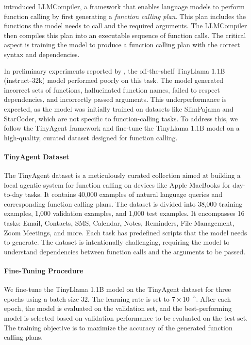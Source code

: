 \citet{llmcompiler} introduced LLMCompiler, a framework that enables language models to perform function calling by first generating a \emph{function calling plan}. This plan includes the functions the model needs to call and the required arguments. The LLMCompiler then compiles this plan into an executable sequence of function calls. The critical aspect is training the model to produce a function calling plan with the correct syntax and dependencies.

In preliminary experiments reported by \citet{tinyagent}, the off-the-shelf TinyLlama 1.1B (instruct-32k) model performed poorly on this task. The model generated incorrect sets of functions, hallucinated function names, failed to respect dependencies, and incorrectly passed arguments. This underperformance is expected, as the model was initially trained on datasets like SlimPajama and StarCoder, which are not specific to function-calling tasks. To address this, we follow the TinyAgent framework and fine-tune the TinyLlama 1.1B model on a high-quality, curated dataset designed for function calling.

\paragraph{TinyAgent Dataset}

The TinyAgent dataset is a meticulously curated collection aimed at building a local agentic system for function calling on devices like Apple MacBooks for day-to-day tasks. It contains 40,000 examples of natural language queries and corresponding function calling plans. The dataset is divided into 38,000 training examples, 1,000 validation examples, and 1,000 test examples. It encompasses 16 tasks: Email, Contacts, SMS, Calendar, Notes, Reminders, File Management, Zoom Meetings, and more. Each task has predefined scripts that the model needs to generate. The dataset is intentionally challenging, requiring the model to understand dependencies between function calls and the arguments to be passed.

\paragraph{Fine-Tuning Procedure}

We fine-tune the TinyLlama 1.1B model on the TinyAgent dataset for three epochs using a batch size 32. The learning rate is set to \(7 \times 10^{-5}\). After each epoch, the model is evaluated on the validation set, and the best-performing model is selected based on validation performance to be evaluated on the test set. The training objective is to maximize the accuracy of the generated function calling plans.

